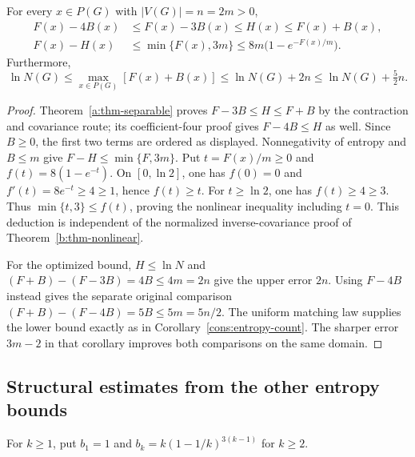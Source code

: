 \begin{corollary}\label{cons:legacy-defect}
For every $x\in P(G)$ with $|V(G)|=n=2m>0$,
\begin{align}
 F(x)-4B(x)&\le F(x)-3B(x)\le H(x)\le F(x)+B(x),\label{cons:legacy-separable}\\
 F(x)-H(x)&\le\min\{F(x),3m\}
                  \le8m\bigl(1-e^{-F(x)/m}\bigr).\label{cons:legacy-nonlinear}
\end{align}
Furthermore,
\begin{equation}\label{cons:legacy-bin-gap}
 \ln N(G)\le\max_{x\in P(G)}[F(x)+B(x)]
       \le\ln N(G)+2n
       \le\ln N(G)+\tfrac52n.
\end{equation}
\end{corollary}
\begin{proof}
Theorem~\ref{a:thm-separable} proves
$F-3B\le H\le F+B$ by the contraction and covariance route; its
coefficient-four proof gives $F-4B\le H$ as well. Since $B\ge0$, the
first two terms are ordered as displayed. Nonnegativity of entropy and
$B\le m$ give $F-H\le\min\{F,3m\}$.
Put $t=F(x)/m\ge0$ and $f(t)=8(1-e^{-t})$. On $[0,\ln2]$, one has
$f(0)=0$ and $f'(t)=8e^{-t}\ge4\ge1$, hence $f(t)\ge t$.
For $t\ge\ln2$, one has $f(t)\ge4\ge3$.
Thus $\min\{t,3\}\le f(t)$, proving the nonlinear inequality including
$t=0$. This deduction is independent of the normalized inverse-covariance
proof of Theorem~\ref{b:thm-nonlinear}.

For the optimized bound, $H\le\ln N$ and
$(F+B)-(F-3B)=4B\le4m=2n$ give the upper error $2n$.
Using $F-4B$ instead gives the separate original comparison
$(F+B)-(F-4B)=5B\le5m=5n/2$. The uniform matching law supplies the
lower bound exactly as in Corollary~\ref{cons:entropy-count}.
The sharper error $3m-2$ in that corollary improves both comparisons
on the same domain.
\end{proof}

\subsection{Structural estimates from the other entropy bounds}

For $k\ge1$, put $b_1=1$ and
$b_k=k(1-1/k)^{3(k-1)}$ for $k\ge2$.

